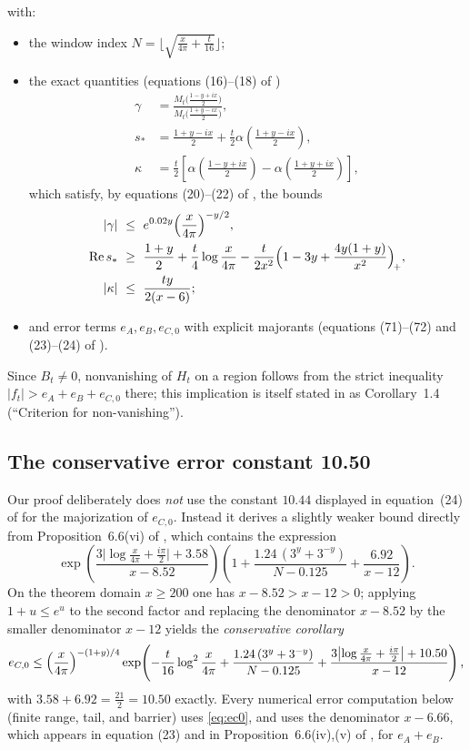 \documentclass[11pt]{article}
\theoremstyle{definition}
\DeclareMathOperator{\Rea}{Re}
\begin{document}
with:
\begin{itemize}
\item the window index
$N=\bigl\lfloor\sqrt{\tfrac{x}{4\pi}+\tfrac{t}{16}}\bigr\rfloor$;
\item the exact quantities (equations (16)--(18) of \cite{Polymath})
\begin{align}
\gamma&=\frac{M_t\bigl(\frac{1-y+ix}{2}\bigr)}
 {M_t\bigl(\frac{1+y-ix}{2}\bigr)},\label{eq:gammaexact}\\
s_*&=\frac{1+y-ix}{2}
 +\frac t2\alpha\!\left(\frac{1+y-ix}{2}\right),
 \label{eq:starexact}\\
\kappa&=\frac t2\left[
 \alpha\!\left(\frac{1-y+ix}{2}\right)
 -\alpha\!\left(\frac{1+y+ix}{2}\right)\right],
 \label{eq:kappaexact}
\end{align}
which satisfy, by equations (20)--(22) of \cite{Polymath}, the bounds
\begin{align}
|\gamma|&\ \le\ e^{0.02y}\Bigl(\frac{x}{4\pi}\Bigr)^{-y/2},
\label{eq:gammabound}\\
\Rea s_*&\ \ge\ \frac{1+y}{2}+\frac t4\log\frac{x}{4\pi}
-\frac{t}{2x^2}\Bigl(1-3y+\frac{4y(1+y)}{x^2}\Bigr)_{\!+},
\label{eq:resbound}\\
|\kappa|&\ \le\ \frac{ty}{2(x-6)};
\label{eq:kappabound}
\end{align}
\item and error terms $e_A,e_B,e_{C,0}$ with explicit majorants
(equations (71)--(72) and (23)--(24) of \cite{Polymath}).
\end{itemize}
Since $B_t\ne0$, nonvanishing of $H_t$ on a region follows from the
strict inequality $|f_t|>e_A+e_B+e_{C,0}$ there; this implication is
itself stated in \cite{Polymath} as Corollary~1.4 (``Criterion for
non-vanishing'').

\subsection{The conservative error constant 10.50}\label{sec:weld}

Our proof deliberately does \emph{not} use the constant $10.44$
displayed in equation~(24) of \cite{Polymath} for the majorization of
$e_{C,0}$.
Instead it derives a
slightly weaker bound directly from Proposition~6.6(vi) of
\cite{Polymath}, which contains the expression
\[
\exp\!\left(\frac{3\bigl|\log\frac{x}{4\pi}+\frac{i\pi}2\bigr|+3.58}{x-8.52}\right)
\left(1+\frac{1.24\,(3^y+3^{-y})}{N-0.125}+\frac{6.92}{x-12}\right).
\]
On the theorem domain $x\ge200$ one has $x-8.52>x-12>0$; applying
$1+u\le e^u$ to the second factor and replacing the denominator
$x-8.52$ by the smaller denominator $x-12$ yields the
\emph{conservative corollary}
\begin{equation}\label{eq:ec0}
e_{C,0}\le
\Bigl(\frac{x}{4\pi}\Bigr)^{-(1+y)/4}
\exp\!\left(
-\frac{t}{16}\log^2\frac{x}{4\pi}
+\frac{1.24\,(3^y+3^{-y})}{N-0.125}
+\frac{3\bigl|\log\frac{x}{4\pi}+\frac{i\pi}2\bigr|+10.50}{x-12}
\right),
\end{equation}
with $3.58+6.92=\tfrac{21}2=10.50$ exactly. Every numerical error
computation below (finite range, tail, and barrier) uses
\eqref{eq:ec0}, and uses the denominator $x-6.66$, which appears in
equation (23) and in Proposition~6.6(iv),(v) of \cite{Polymath}, for
$e_A+e_B$.
\end{document}
